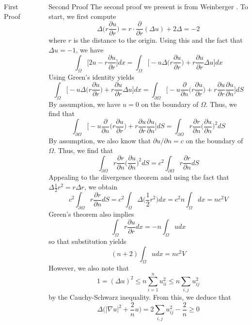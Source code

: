 \documentclass[final]{beamer}
\newlength{\sepwidth}
\newlength{\colwidth}
\newcommand{\separatorcolumn}{\begin{column}{\sepwidth}\end{column}}
\begin{document}
\begin{frame}[t]
\begin{columns}[t]
\begin{column}{\colwidth}
\begin{block}{First Proof}
\end{block}  
\end{column}

\separatorcolumn

\begin{column}{\colwidth}


  \begin{block}{Second Proof}
The second proof we present is from Weinberger \cite{weinberger71}. To start, we first compute
\[
\Delta\bigg(r \frac{\partial{u}}{\partial{r}}\bigg) = r \cdot \frac{\partial}{\partial{r}} (\Delta u) + 2\Delta = -2
\] where $r$ is the distance to the origin. Using this and the fact that $\Delta u = -1$, we have
\[
\int_\Omega \bigg[ 2u - r\frac{\partial{u}}{\partial{r}}\bigg] dx = \int_\Omega \bigg[ -u \Delta \bigg(r \frac{\partial{u}}{\partial{r}} \bigg) + r \frac{\partial{u}}{\partial{r}} \Delta u \bigg] dx
\]
    Using Green's identity yields
\[
\int_\Omega \bigg[ -u \Delta \bigg(r \frac{\partial{u}}{\partial{r}} \bigg) + r \frac{\partial{u}}{\partial{r}} \Delta u \bigg] dx = \int_{\partial{\Omega}} \bigg[ - u \frac{\partial}{\partial{n}}\bigg(r\frac{\partial{u}}{\partial{r}}\bigg)+ r \frac{\partial{u}}{\partial{r}}\frac{\partial{u}}{\partial{n}}\bigg] dS
\] By assumption, we have $u = 0$ on the boundary of $\Omega$. Thus, we find that
\[
\int_{\partial{\Omega}} \bigg[ - u \frac{\partial}{\partial{n}}\bigg(r\frac{\partial{u}}{\partial{r}}\bigg)+ r \frac{\partial{u}}{\partial{r}}\frac{\partial{u}}{\partial{n}}\bigg] dS =  \int_{\partial{\Omega}} r \frac{\partial{r}}{\partial{n}} \bigg(\frac{\partial{u}}{\partial{n}}\bigg)^2 dS
\] By assumption, we also know that $\partial{u}/\partial{n} = c$ on the boundary of $\Omega$. Thus, we find that
\[
\int_{\partial{\Omega}} r \frac{\partial{r}}{\partial{n}} \bigg(\frac{\partial{u}}{\partial{n}}\bigg)^2 dS = c^2 \int_{\partial{\Omega}} r\frac{\partial{r}}{\partial{n}} dS
\] Appealing to the divergence theorem and using the fact that $\Delta \frac{1}{2}r^2 = r \Delta r$, we obtain
\[
c^2 \int_{\partial{\Omega}} r\frac{\partial{r}}{\partial{n}} dS = c^2 \int_{\Omega} \Delta\bigg(\frac{1}{2}r^2\bigg) dx = c^2 n \int_{\Omega} dx =  nc^2 V
\] Green's theorem also implies
\[
\int_{\Omega} r \frac{\partial{u}}{\partial{r}} dx = -n \int_{\Omega} u dx
\] so that substitution yields
\[
(n+2) \int_\Omega u d x = nc^2V
\] However, we also note that
\[
1 = (\Delta u)^2 \leq n \sum_{i=1}^n u_{ii}^2 \leq n \sum_{i,j} u_{ij}^2
\] by the Cauchy-Schwarz inequality. From this, we deduce that
\[
\Delta\bigg( \vert \nabla u\vert^2 + \frac{2}{n}u\bigg) = 2\sum_{i,j} u_{ij}^2 - \frac{2}{n} \geq 0
\]
\end{block}
\end{column}
\end{columns}
\end{frame}
\end{document}
